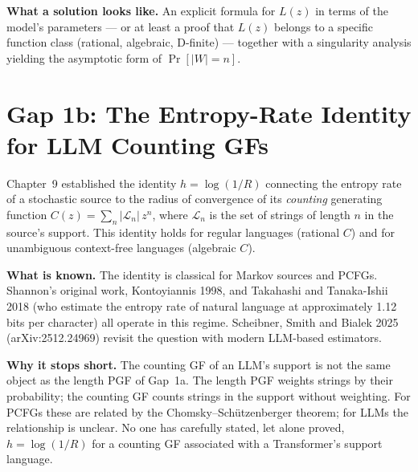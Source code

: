 \textbf{What a solution looks like.} An explicit formula for $L(z)$ in terms of the model's parameters --- or at least a proof that $L(z)$ belongs to a specific function class (rational, algebraic, D-finite) --- together with a singularity analysis yielding the asymptotic form of $\Pr[|W|=n]$.

\section{Gap 1b: The Entropy-Rate Identity for LLM Counting GFs}
\label{ch18:gap1b}

Chapter~9 established the identity $h=\log(1/R)$ connecting the entropy rate of a stochastic source to the radius of convergence of its \emph{counting} generating function $C(z)=\sum_n |\mathcal{L}_n|\,z^n$, where $\mathcal{L}_n$ is the set of strings of length $n$ in the source's support. This identity holds for regular languages (rational $C$) and for unambiguous context-free languages (algebraic $C$).

\textbf{What is known.} The identity is classical for Markov sources and PCFGs. Shannon's original work, Kontoyiannis 1998, and Takahashi and Tanaka-Ishii 2018 \cite{TakahashiTanakaIshii2018} (who estimate the entropy rate of natural language at approximately 1.12 bits per character) all operate in this regime. Scheibner, Smith and Bialek 2025 \cite{ScheibnerSmithBialek2025} (arXiv:2512.24969) revisit the question with modern LLM-based estimators.

\textbf{Why it stops short.} The counting GF of an LLM's support is not the same object as the length PGF of Gap~1a. The length PGF weights strings by their probability; the counting GF counts strings in the support without weighting. For PCFGs these are related by the Chomsky--Sch\"utzenberger theorem; for LLMs the relationship is unclear. No one has carefully stated, let alone proved, $h=\log(1/R)$ for a counting GF associated with a Transformer's support language.

